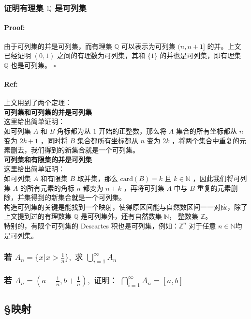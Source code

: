 \documentclass{article}
\begin{document}
\subsubsection{证明有理集 $\mathbb{Q}$ 是可列集}
\paragraph{Proof:}
由于可列集的并是可列集，而有理集 $\mathbb{Q}$ 可以表示为可列集 $(n, n + 1]$ 的并。上文已经证明 $(0, 1)$ 之间的有理数为可列集，其和 $\{1\}$ 的并也是可列集，即有理集 $\mathbb{Q}$ 也是可列集。 $\square$
\paragraph{Ref:}
上文用到了两个定理：\\
\textbf{可列集和可列集的并是可列集}\\
这里给出简单证明：\\
如可列集 $A$ 和 $B$ 角标都为从 $1$ 开始的正整数，那么将 $A$ 集合的所有坐标都从 $n$ 变为 $2k + 1$ ，同时将 $B$ 集合都所有坐标都从 $n$ 变为 $2k$ ，将两个集合中重复的元素删去，我们得到的新集合就是一个可列集。\\
\textbf{可列集和有限集的并是可列集}\\
这里给出简单证明：\\
如可列集 $A$ 和有限集 $B$ 取并集，那么 $\text{card}(B) = k \text{ 且 } k \in \mathbb{N}$ ，因此我们将可列集 $A$ 的所有元素的角标 $n$ 都变为 $n + k$ ，再将可列集 $A$ 中与 $B$ 重复的元素删除，并集得到的新集合就是一个可列集。\\
构造可列集的关键是能找到一个映射，使得原区间能与自然数区间一一对应，除了上文提到过的有理数集 $\mathbb{Q}$ 是可列集外，还有自然数集 $\mathbb{N}$， 整数集 $\mathbb{Z}$。\\
特别的，有限个可列集的 Descartes 积也是可列集，例如：$\mathbb{Z}^n$ 对于任意 $n \in \mathbb{N}$均是可列集。

\subsubsection{若 $A_{n} = \{x | x > \frac{1}{n}\}, \text{ 求 } \bigcup_{i = 1}^{\infty} A_n$}

\subsubsection{若 $A_{n} = ( a - \frac{1}{n}, b + \frac{1}{n} ), \text{ 证明： } \bigcap_{i=1}^{\infty}A_n = [a, b]$}

\subsection{\S 映射}
\end{document}
